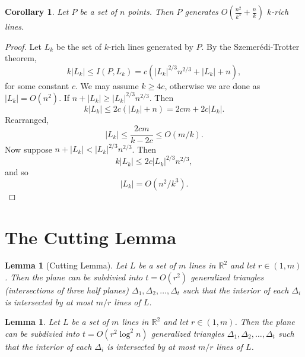 \documentclass[10pt,reqno]{amsart}
\newtheorem{lemma}[theorem]{Lemma}
\newtheorem{corollary}[theorem]{Corollary}
\theoremstyle{definition}
\theoremstyle{remark}
\renewcommand{\leq}{\leqslant}
\renewcommand{\geq}{\geqslant}
\def\R{\mathbb{R}}
\numberwithin{equation}{section}
\begin{document}
\begin{corollary}\label{cor:szemeredi-trotter}
	Let $P$ be a set of $n$ points. Then $P$ generates $O(\frac{n^2}{k^3} + \frac{n}{k})$ $k$-rich lines.
\end{corollary}

\begin{proof}
	Let $L_k$ be the set of $k$-rich lines generated by $P$. By the Szemerédi-Trotter theorem, 
	\[
		k|L_k| \leq I(P, L_k) = c(|L_k|^{2/3}n^{2/3} + |L_k| + n),
	\]
	for some constant $c$. We may assume $k \geq 4c$, otherwise we are done as $|L_k| = O(n^2)$. If $n + |L_k| \geq |L_k|^{2/3}n^{2/3}$. Then 
	\[
		k|L_k| \leq 2c(|L_k| + n) = 2cm + 2c|L_k|.
	\]
	Rearranged,
	\[
		|L_k| \leq \frac{2cm}{k - 2c} \leq O(m/k).
	\]
	Now suppose $n + |L_k| < |L_k|^{2/3}n^{2/3}$. Then 
	\[
		k|L_k| \leq 2c|L_k|^{2/3}n^{2/3},
	\]
	and so 
	\[
		|L_k|= O(n^{2}/k^3). 
	\]
\end{proof}

\newpage

\section{The Cutting Lemma}

\begin{lemma}[Cutting Lemma]
	Let $L$ be a set of $m$ lines in $\R^2$ and let $r \in (1, m)$. Then the plane can be subdivied into $t = O(r^2)$ generalized triangles (intersections of three half planes) $\Delta_1, \Delta_2, \ldots, \Delta_t$ such that the interior of each $\Delta_i$ is intersected by at most $m/r$ lines of $L$. 
\end{lemma}

\begin{lemma}
	Let $L$ be a set of $m$ lines in $\R^2$ and let $r \in (1, m)$. Then the plane can be subdivied into $t = O(r^2\log^2 n)$ generalized triangles $\Delta_1, \Delta_2, \ldots, \Delta_t$ such that the interior of each $\Delta_i$ is intersected by at most $m/r$ lines of $L$. 
\end{lemma}
\end{document}
